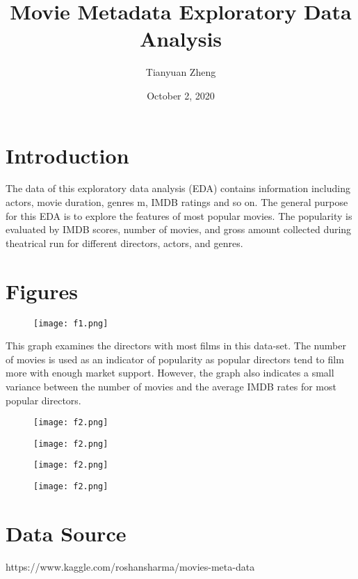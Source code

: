 \documentclass{article}
\title{Movie Metadata Exploratory Data Analysis}
\author{Tianyuan Zheng}
\date{October 2, 2020}
\begin{document}
\maketitle

\section{Introduction}
The data of this exploratory data analysis (EDA) contains information including actors, movie duration, genres m, IMDB ratings and so on. The general purpose for this EDA is to explore the features of most popular movies. The popularity is evaluated by IMDB scores, number of movies, and gross amount collected during theatrical run for different directors, actors, and genres.

\section{Figures}

\begin{figure}[H]
\texttt{[image: f1.png]}
\end{figure}

This graph examines the directors with most films in this data-set. The number of movies is used as an indicator of popularity as popular directors tend to film more with enough market support. However, the graph also indicates a small variance between the number of movies and the average IMDB rates for most popular directors.

\begin{figure}[H]
\texttt{[image: f2.png]}
\end{figure}

\begin{figure}[H]
\texttt{[image: f2.png]}
\end{figure}
\begin{figure}[H]
\texttt{[image: f2.png]}
\end{figure}
\begin{figure}[H]
\texttt{[image: f2.png]}
\end{figure}

\section{Data Source}
https://www.kaggle.com/roshansharma/movies-meta-data
\end{document}
